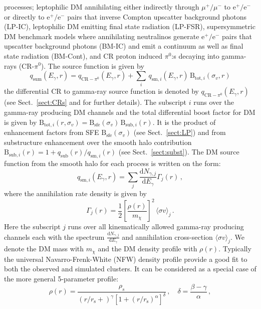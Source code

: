 \documentclass[10pt,aps,pra,reprint,amsmath,amsfonts,amssymb,showpacs]{revtex4-1}
\newcommand{\rmn}{\mathrm}
\newcommand{\sfe}{\rmn{sfe}}
\newcommand{\sub}{\rmn{sub}}
\newcommand{\s}{\rmn{s}}
\newcommand{\B}{\rmn{B}}
\newcommand{\qCR}{q_{\rmn{CR}-\ensuremath{\pi^0}}}
\newcommand{\dd}{\rmn{d}}
\newcommand{\mx}{\ensuremath{m_{\chi}}}
\newcommand{\ngammaj}{\ensuremath{N_{\gamma,j}}}
\newcommand{\sigmaannv}{\ensuremath{\langle\sigma v\rangle}}
\newcommand{\sigv}{\ensuremath{\sigma_v}}
\newcommand{\egamma}{\ensuremath{E_{\gamma}}}
\newcommand{\rhos}{\ensuremath{\rho_s}}
\newcommand{\eg}{E_\gamma}
\begin{document}
processes; leptophilic DM annihilating either indirectly through
$\mu^+/\mu^-$ to $\rmn{e}^+/\rmn{e}^-$ or directly to
$\rmn{e}^+/\rmn{e}^-$ pairs that inverse Compton upscatter background
photons (LP-IC), leptophilic DM emitting final state radiation
(LP-FSR), supersymmetric DM benchmark models where annihilating
neutralinos generate $\rmn{e}^+/\rmn{e}^-$ pairs that upscatter
background photons (BM-IC) and emit a continuum as well as final state
radiation (BM-Cont), and CR proton induced $\pi^0$:s decaying into
gamma-rays (CR-$\pi^0$). The source function is given by
\begin{equation}
q_\rmn{sum} (\eg,r) = \qCR(\eg,r)+
\sum_i \,q_{\rmn{sm},i}(\eg,r)\,\B_{\rmn{tot},i}(\sigv,r)
\end{equation}
the differential CR to gamma-ray source function is denoted by
$\qCR(\eg,r)$ (see Sect.~\ref{sect:CRs} and \cite{2010MNRAS.409..449P}
for further details). The subscript $i$ runs over the gamma-ray
producing DM channels and the total differential boost factor for DM
is given by $\B_{\rmn{tot},i}(r,\sigv) =
\B_\sfe(\sigv)\,\B_{\sub,i}(r)$. It is the product of enhancement factors
from SFE $\B_\sfe(\sigv)$ (see Sect.~\ref{sect:LP}) and from
substructure enhancement over the smooth halo contribution
$\B_{\sub,i}(r) = 1+q_\sub(r)/q_{\rmn{sm},i}(r)$ (see
Sect.~\ref{sect:subst}). The DM source function from the smooth halo
for each process is written on the form:
\begin{equation}
\label{eq:q_sm}
q_{\rmn{sm},i} (\egamma,r) = \sum_j
\frac{\dd \ngammaj}{\dd E_\gamma} \Gamma_j(r)\,,
\end{equation}
where the annihilation rate density is given by 
\begin{equation}
\label{eq:ann_rate}
\Gamma_j(r) = \frac{1}{2} \left[\frac{\rho(r)}{\mx}\right]^2 
\, \sigmaannv_j\,.
\end{equation}
Here the subscript $j$ runs over all kinematically allowed gamma-ray
producing channels each with the spectrum $\frac{\dd
  \ngammaj}{\dd\eg}$ and annihilation cross-section $\sigmaannv_j$. We
denote the DM mass with $\mx$ and the DM density profile with
$\rho(r)$. Typically the universal Navarro-Frenk-White (NFW) density
profile provide a good fit to both the observed and simulated
clusters. It can be considered as a special case of the more general
5-parameter profile:
\begin{equation}
\rho(r) = \frac{\rhos}{\left(r/r_\s+\right)^\gamma
  \left[1+\left(r/r_\s\right)^\alpha\right]^\delta}\,,\quad
\delta=\frac{\beta-\gamma}{\alpha}\,,
\label{eq:rho_nfw}
\end{equation}
\end{document}
